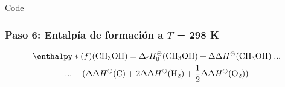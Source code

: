 \documentclass{beamer}
\begin{document}
\begin{frame}[fragile]{Code}
\frametitle{Paso 6: Entalpía de formación a $T$ = 298 K}

\begin{multline}
	\enthalpy*(f){}\mathrm{(CH_3OH)} = \mathrm{\Delta}_\mathrm{{f}} H^{\circleddash}_{0}\mathrm{(CH_{3}OH)} + \mathrm{\Delta \Delta} H^{\circleddash} \mathrm{(CH_{3}OH)}\;...\\ ...- (\mathrm{\Delta \Delta} H^{\circleddash} \mathrm{(C)} + 2 \mathrm{\Delta \Delta} H^{\circleddash}\mathrm{(H_{2})} + \mathrm{\frac{1}{2}} \mathrm{\Delta \Delta} H^{\circleddash}\mathrm{(O_{2}))}
\label{eq:4.16}
\end{multline}


\end{frame}


\end{document}
